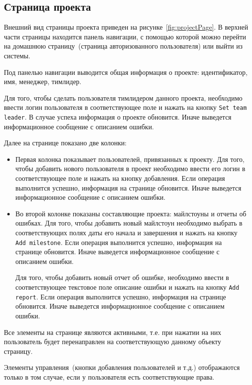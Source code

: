 \subsection{Страница проекта}
Внешний вид страницы проекта приведен на рисунке~\ref{fig:projectPage}. В верхней части страницы находится панель навигации, с помощью которой можно перейти на домашнюю страницу~(страница авторизованного пользователя) или выйти из системы. 

Под панелью навигации выводится общая информация о проекте: идентификатор, имя, менеджер, тимлидер.

Для того, чтобы сделать пользователя тимлидером данного проекта, необходимо ввести логин пользователя в соответствующее поле и нажать на кнопку \texttt{Set team leader}. В случае успеха информация о проекте обновится. Иначе выведется информационное сообщение с описанием ошибки.

Далее на странице показано две колонки:
\begin{itemize}
	\item Первая колонка показывает пользователей, привязанных к проекту. Для того, чтобы добавить нового пользователя в проект необходимо ввести его логин в соответствующее поле и нажать на кнопку добавления. Если операция выполнится успешно, информация на странице обновится. Иначе выведется информационное сообщение с описанием ошибки.
	
	\item Во второй колонке показаны составляющие проекта: майлстоуны и отчеты об ошибках. Для того, чтобы добавить новый майлстоун необходимо выбрать в соответствующих полях даты его начала и завершения и нажать на кнопку \texttt{Add milestone}. Если операция выполнится успешно, информация на странице обновится. Иначе выведется информационное сообщение с описанием ошибки.
	
	Для того, чтобы добавить новый отчет об ошибке, необходимо ввести в соответствующее текстовое поле описание ошибки и нажать на кнопку \texttt{Add report}. Если операция выполнится успешно, информация на странице обновится. Иначе выведется информационное сообщение с описанием ошибки.
\end{itemize}

Все элементы на странице являются активными, т.е. при нажатии на них пользователь будет перенаправлен на соответствующую данному объекту страницу. 

Элементы управления~(кнопки добавления пользователей и т.д.) отображаются только в том случае, если у пользователя есть соответствующие права.

